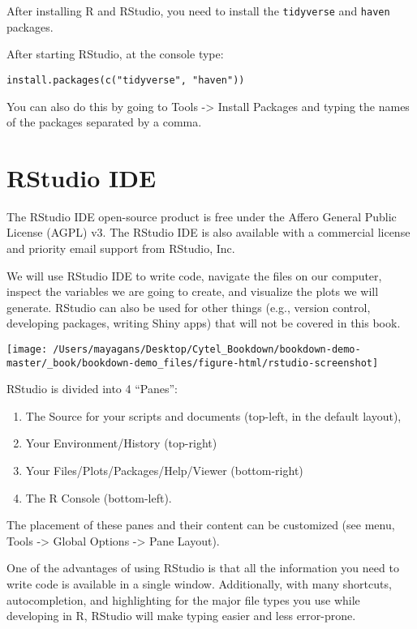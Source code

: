 \documentclass[]{book}
\providecommand{\tightlist}{%
  \setlength{\itemsep}{0pt}\setlength{\parskip}{0pt}}
\begin{document}
After installing R and RStudio, you need to install the \texttt{tidyverse} and \texttt{haven} packages.

After starting RStudio, at the console type:

\begin{verbatim}
install.packages(c("tidyverse", "haven"))
\end{verbatim}

You can also do this by going to Tools -\textgreater{} Install Packages and typing the names of the packages separated by a comma.

\hypertarget{intro}{%
\chapter{RStudio IDE}\label{intro}}

The RStudio IDE open-source product is free under the Affero General Public License (AGPL) v3. The RStudio IDE is also available with a commercial license and priority email support from RStudio, Inc.

We will use RStudio IDE to write code, navigate the files on our computer, inspect the variables we are going to create, and visualize the plots we will generate. RStudio can also be used for other things (e.g., version control, developing packages, writing Shiny apps) that will not be covered in this book.

\texttt{[image: /Users/mayagans/Desktop/Cytel\_Bookdown/bookdown-demo-master/\_book/bookdown-demo\_files/figure-html/rstudio-screenshot]}

RStudio is divided into 4 ``Panes'':

\begin{enumerate}
\def\labelenumi{\arabic{enumi})}
\tightlist
\item
  The Source for your scripts and documents (top-left, in the default layout),
\item
  Your Environment/History (top-right)
\item
  Your Files/Plots/Packages/Help/Viewer (bottom-right)
\item
  The R Console (bottom-left).
\end{enumerate}

The placement of these panes and their content can be customized (see menu, Tools -\textgreater{} Global Options -\textgreater{} Pane Layout).

One of the advantages of using RStudio is that all the information you need to write code is available in a single window. Additionally, with many shortcuts, autocompletion, and highlighting for the major file types you use while developing in R, RStudio will make typing easier and less error-prone.
\end{document}
